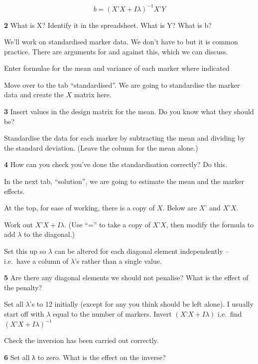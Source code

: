\documentclass[
]{book}
\makeatletter
\newenvironment{kframe}{%
\medskip{}
\setlength{\fboxsep}{.8em}
 \def\at@end@of@kframe{}%
 \ifinner\ifhmode%
  \def\at@end@of@kframe{\end{minipage}}%
  \begin{minipage}{\columnwidth}%
 \fi\fi%
 \def\FrameCommand##1{\hskip\@totalleftmargin \hskip-\fboxsep
 \colorbox{shadecolor}{##1}\hskip-\fboxsep
     \hskip-\linewidth \hskip-\@totalleftmargin \hskip\columnwidth}%
 \MakeFramed {\advance\hsize-\width
   \@totalleftmargin\z@ \linewidth\hsize
   \@setminipage}}%
 {\par\unskip\endMakeFramed%
 \at@end@of@kframe}
\newenvironment{rmdblock}[1]
  {
  \begin{itemize}
  \renewcommand{\labelitemi}{
    \raisebox{-.7\height}[0pt][0pt]{
      {\setkeys{Gin}{width=3em,keepaspectratio}\texttt{[image: images/\#1]}}
    }
  }
  \setlength{\fboxsep}{1em}
  \begin{kframe}
  \item
  }
  {
  \end{kframe}
  \end{itemize}
  }
\newenvironment{rmdquiz}
  {\begin{rmdblock}{quiz}}
  {\end{rmdblock}}
\makeatother
\begin{document}
\[b = (X’X+Iλ)^{-1} X’Y\]

\begin{rmdquiz}
\textbf{2} What is X? Identify it in the spreadsheet. What is Y? What is b?
\end{rmdquiz}

We'll work on standardised marker data. We don't have to but it is common practice. There are arguments for and against this, which we can discuss.

Enter formulae for the mean and variance of each marker where indicated

Move over to the tab ``standardised''. We are going to standardise the marker data and create the \(X\) matrix here.

\begin{rmdquiz}
\textbf{3}
Insert values in the design matrix for the mean. Do you know what they should be?
\end{rmdquiz}

Standardise the data for each marker by subtracting the mean and dividing by the standard deviation. (Leave the column for the mean alone.)

\begin{rmdquiz}
\textbf{4}
How can you check you've done the standardisation correctly? Do this.
\end{rmdquiz}

In the next tab, ``solution'', we are going to estimate the mean and the marker effects.

At the top, for ease of working, there is a copy of \(X\). Below are \(X’\) and \(X’X\).

Work out \(X’X + Iλ\). (Use ``='' to take a copy of \(X’X\), then modify the formula to add \(λ\) to the diagonal.)

Set this up so \(λ\) can be altered for each diagonal element independently -- i.e.~have a column of \(λ\)'s rather than a single value.

\begin{rmdquiz}
\textbf{5} Are there any diagonal elements we should not penalise? What is the effect of the penalty?
\end{rmdquiz}

Set all \(λ\)'s to 12 initially (except for any you think should be left alone). I usually start off with \(λ\) equal to the number of markers. Invert \((X’X + Iλ)\) i.e.~find \((X’X + Iλ)^{-1}\)

Check the inversion has been carried out correctly.

\begin{rmdquiz}
\textbf{6}
Set all λ to zero. What is the effect on the inverse?
\end{rmdquiz}
\end{document}

